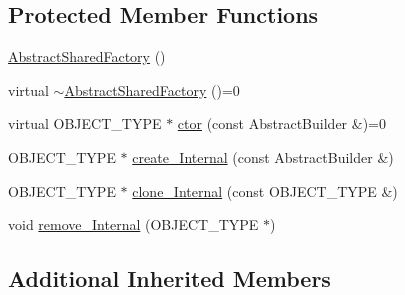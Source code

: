 \subsection*{Protected Member Functions}
\begin{DoxyCompactItemize}
\item 
\hyperlink{class_abstract_shared_factory_a424631661fee3c3c1dfd6bc4f39f6fab}{Abstract\+Shared\+Factory} ()
\item 
virtual \hyperlink{class_abstract_shared_factory_a1555d35824b19786b66c3ae9df617135}{$\sim$\+Abstract\+Shared\+Factory} ()=0
\item 
virtual O\+B\+J\+E\+C\+T\+\_\+\+T\+Y\+P\+E $\ast$ \hyperlink{class_abstract_shared_factory_a3a822396c66b512633644b1658a172d4}{ctor} (const Abstract\+Builder \&)=0
\item 
O\+B\+J\+E\+C\+T\+\_\+\+T\+Y\+P\+E $\ast$ \hyperlink{class_abstract_shared_factory_a772a1578f83e9d7f94b38015cbb22ebb}{create\+\_\+\+Internal} (const Abstract\+Builder \&)
\item 
O\+B\+J\+E\+C\+T\+\_\+\+T\+Y\+P\+E $\ast$ \hyperlink{class_abstract_shared_factory_aefa83a453407e19ac53e7478d9f92c9c}{clone\+\_\+\+Internal} (const O\+B\+J\+E\+C\+T\+\_\+\+T\+Y\+P\+E \&)
\item 
void \hyperlink{class_abstract_shared_factory_a3ce56d54b55727bf1dab3b32dd07d9ed}{remove\+\_\+\+Internal} (O\+B\+J\+E\+C\+T\+\_\+\+T\+Y\+P\+E $\ast$)
\end{DoxyCompactItemize}
\subsection*{Additional Inherited Members}


